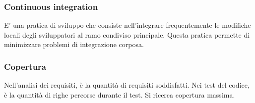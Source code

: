 \subsubsection*{Continuous integration}
E’ una pratica di sviluppo che consiste nell’integrare frequentemente le modifiche locali degli sviluppatori al
ramo condiviso principale. Questa pratica permette di minimizzare problemi di integrazione corposa.

\subsubsection*{Copertura}
Nell'analisi dei requisiti, è la quantità di requisiti soddisfatti. Nei test del codice, è la quantità di righe percorse durante il test. Si ricerca copertura massima.


